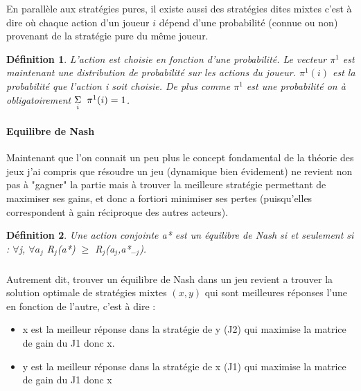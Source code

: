 \documentclass[a4paper, 12pt, twoside]{article}
\newtheorem{definition}{Définition}
\begin{document}
En parallèle aux stratégies pures, il existe aussi des stratégies dites mixtes c'est à dire où chaque action d'un joueur $i$ dépend d'une probabilité (connue ou non) provenant de la stratégie pure du même joueur. \newline


\begin{definition}
L'action est choisie en fonction d'une probabilité. Le vecteur $\pi^{1}$ est maintenant une distribution  de probabilité sur les actions du joueur. $\pi^{1}(i)$ est la probabilité que l'action i soit choisie. De plus comme  $\pi^{1}$ est une probabilité on à obligatoirement $\underset{i}{\Sigma}  \hspace{0,2 cm} \pi^{1}(i) = 1$.
\end{definition}

\paragraph{Equilibre de Nash}
{Maintenant que l'on connait un peu plus le concept fondamental de la \textsf{théorie des jeux} j'ai compris que résoudre un jeu (dynamique bien évidement) ne revient non pas à "gagner" la partie mais à trouver la meilleure stratégie permettant de maximiser ses gains, et donc a fortiori minimiser ses pertes (puisqu'elles correspondent à gain réciproque des autres acteurs).} 

\begin{definition}
Une action conjointe a* est un équilibre de Nash si et seulement si : $ \forall $j, $ \forall a_{j}$ R$ _{j} $(a*) $ \geq $ R$ _{j} $(a$ _{j} $,a*$ _{-j} $).
\end{definition}


\subparagraph*{}{Autrement dit, trouver \textsf{un équilibre de Nash} dans un jeu revient a trouver la solution optimale de stratégies mixtes $(x,y)$  qui sont meilleures réponses l'une en fonction de l'autre, c'est à dire :}
\begin{itemize}
\item x est la meilleur réponse dans la stratégie de y (J2) qui maximise la matrice de gain du J1 donc x.
\item y est la meilleur réponse dans la stratégie de x (J1) qui maximise la matrice de gain du J1  donc x
\end{itemize}  
\end{document}
